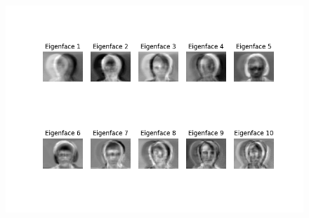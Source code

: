 \documentclass[12pt]{article}
\begin{document}
\begin{figure}[H]
    \centering
    \includegraphics[width=1\textwidth]{eigenfaces_all.png}
\end{figure} 
\end{document}
